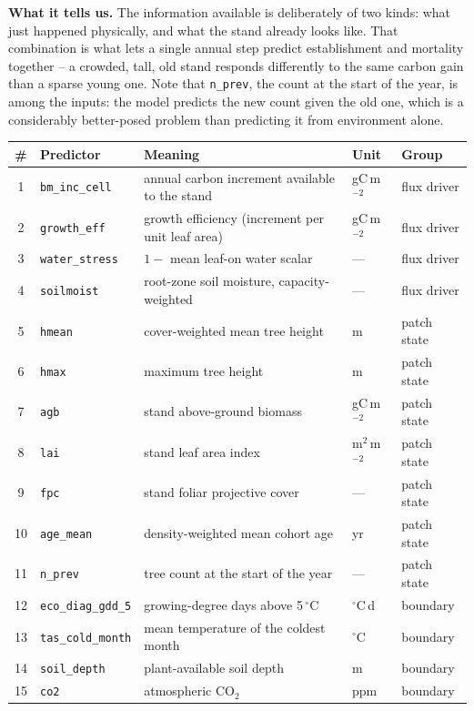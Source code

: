 \documentclass[11pt]{article}
\begin{document}
\begin{table}[h]
{\textbf{What it tells us.} The information available is deliberately of two kinds: what just happened physically, and what the stand already looks like. That combination is what lets a single annual step predict establishment and mortality together -- a crowded, tall, old stand responds differently to the same carbon gain than a sparse young one. Note that \texttt{n\_prev}, the count at the start of the year, is among the inputs: the model predicts the new count given the old one, which is a considerably better-posed problem than predicting it from environment alone.}
\label{tab:count_inputs}
\small
\begin{tabular}{cllll}
\toprule
\# & Predictor & Meaning & Unit & Group \\
\midrule
1 & \texttt{bm\_inc\_cell} & annual carbon increment available to the stand & gC\,m$^{-2}$ & flux driver \\
2 & \texttt{growth\_eff} & growth efficiency (increment per unit leaf area) & gC\,m$^{-2}$ & flux driver \\
3 & \texttt{water\_stress} & $1 -$ mean leaf-on water scalar & --- & flux driver \\
4 & \texttt{soilmoist} & root-zone soil moisture, capacity-weighted & --- & flux driver \\
\midrule
5 & \texttt{hmean} & cover-weighted mean tree height & m & patch state \\
6 & \texttt{hmax} & maximum tree height & m & patch state \\
7 & \texttt{agb} & stand above-ground biomass & gC\,m$^{-2}$ & patch state \\
8 & \texttt{lai} & stand leaf area index & m$^2$\,m$^{-2}$ & patch state \\
9 & \texttt{fpc} & stand foliar projective cover & --- & patch state \\
10 & \texttt{age\_mean} & density-weighted mean cohort age & yr & patch state \\
11 & \texttt{n\_prev} & tree count at the start of the year & --- & patch state \\
\midrule
12 & \texttt{eco\_diag\_gdd\_5} & growing-degree days above 5\,$^\circ$C & $^\circ$C\,d & boundary \\
13 & \texttt{tas\_cold\_month} & mean temperature of the coldest month & $^\circ$C & boundary \\
14 & \texttt{soil\_depth} & plant-available soil depth & m & boundary \\
15 & \texttt{co2} & atmospheric CO$_2$ & ppm & boundary \\
\bottomrule
\end{tabular}
\end{table}
\end{document}
